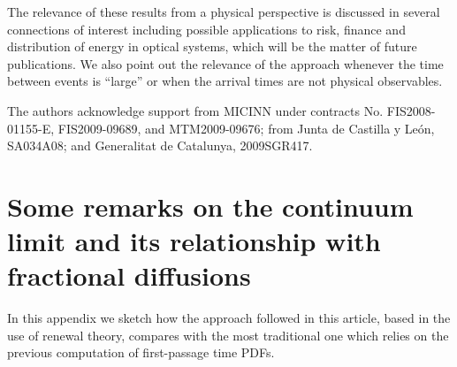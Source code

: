 \documentclass[english,aps,a4paper,twocolumn,showpacs,showkeys,amsfonts,amsmath,amssymb,amscd,nofootinbib]{revtex4}
\newcommand{\1}{\'\i}
\newcommand{\EE}{\mathbb{E}}
\newcommand{\TT}{\mathbb{T}}\newcommand{\FF}{\mathbb{F}}
\begin{document}
The relevance  of  these results from a physical perspective is discussed in several
connections  of interest  including  possible
applications to risk, finance and distribution of energy in  optical systems, which will be the matter of future publications. We also point
out the relevance of the approach whenever   the  time between events  is
``large''
 or when the  arrival  times  are not physical
 observables.
 
 
\acknowledgments

The authors acknowledge support from MICINN under contracts No. %
FIS2008-01155-E, FIS2009-09689, and MTM2009-09676; from  Junta de Castilla y Le\'on, SA034A08; and Generalitat de Catalunya, 2009SGR417.

\appendix

\section{Some remarks on the continuum limit and its relationship with fractional diffusions}
In this appendix we sketch how the approach followed in this article, based in the use of renewal theory, compares with the most traditional one which relies on the previous computation of first-passage time PDFs.


\end{document}
